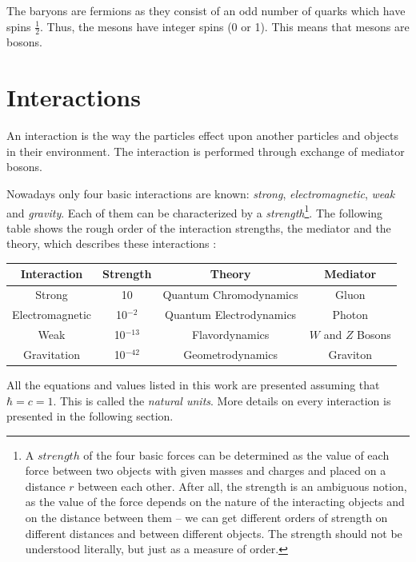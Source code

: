 The baryons are fermions as they consist of an odd number of quarks which have spins $\frac{1}{2}$. Thus, the mesons have integer spins
(0 or 1). This means that mesons are bosons.

\section{Interactions}

An interaction is the way the particles effect upon another particles and objects in their environment. The interaction is performed through exchange
of mediator bosons.

Nowadays only four basic interactions are known: \textit{strong}, \textit{electromagnetic}, \textit{weak} and \textit{gravity}. 
Each of them can be characterized by a \textit{strength}\footnote{A $strength$\cite{griffiths2008introduction} of the four basic forces can be determined as the value of each force
between two objects with given masses and charges and placed on a distance $r$ between each other. After all, the strength is an ambiguous notion, as the 
value of the force depends on the nature of the interacting objects and on the distance between them -- we can get different orders of strength on different
distances  and between different objects. The strength should not be understood literally, but just as a measure of order.}.
The following table shows the rough order of the interaction strengths, the mediator
and the theory, which describes these interactions \cite{griffiths2008introduction}:

\begin{center}\label{tab:forces}
  \begin{tabular}{ | c | c | c | c | }
    \hline
    \textbf{Interaction} & \textbf{Strength} & \textbf{Theory} & \textbf{Mediator} \\ \hline \hline
    Strong & 10 & Quantum Chromodynamics & Gluon \\ \hline 
    Electromagnetic & 10$^{-2}$ & Quantum Electrodynamics & Photon \\ \hline
    Weak & 10$^{-13}$ & Flavordynamics & $W$ and $Z$ Bosons \\ \hline
    Gravitation & 10$^{-42}$ & Geometrodynamics & Graviton \\
    \hline
  \end{tabular}
\end{center}

All the equations and values listed in this work are presented assuming that $\hbar = c = 1$. This is called the \textit{natural units}. 
More details on every interaction is presented in the following section.

